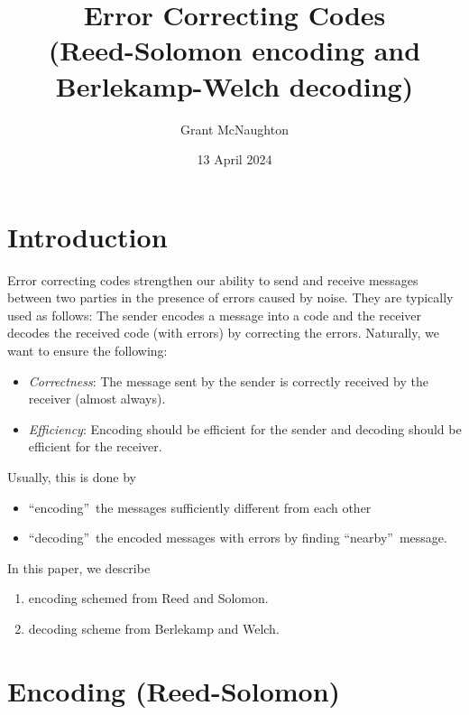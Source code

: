 \documentclass{article}
\begin{document}
\title{Error Correcting Codes \\(Reed-Solomon encoding and Berlekamp-Welch decoding)}
\author{Grant McNaughton}
\date{13 April 2024}
\maketitle

\section{Introduction}

Error correcting codes strengthen our ability to send and receive messages between two
parties in the presence of errors caused by noise. They are typically used as follows: The sender encodes a message into  a code and the receiver decodes
the received code (with errors) by correcting the errors. Naturally, we want to
ensure the following:

\begin{itemize}
\item \emph{Correctness}: The message sent by the sender is correctly received
by the receiver (almost always).

\item \emph{Efficiency}: Encoding should be efficient for the sender and
decoding should be efficient for the receiver.
\end{itemize}

\noindent Usually, this is done by

\begin{itemize}
\item \textquotedblleft encoding\textquotedblright\ the messages sufficiently
different from each other

\item \textquotedblleft decoding\textquotedblright\ the encoded messages with
errors by finding \textquotedblleft nearby\textquotedblright\ message.
\end{itemize}

\noindent In this paper, we describe

\begin{enumerate}
\item encoding schemed from Reed and Solomon.

\item decoding scheme from Berlekamp and Welch.
\end{enumerate}

\section{Encoding (Reed-Solomon)}
\end{document}
